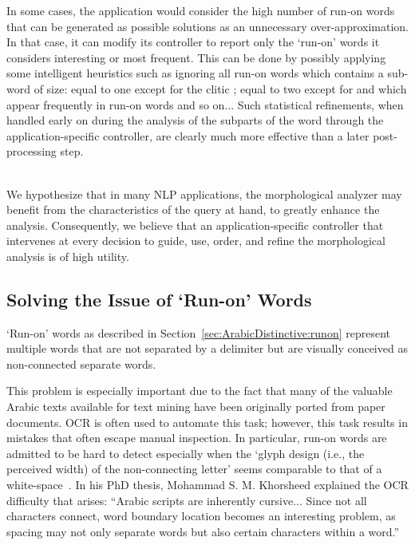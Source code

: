 \documentclass[a4,12pt]{report}
\newcommand{\noVocRL}[1]{\transtrue\novocalize\RL{#1}\vocalize}
\begin{document}
In some cases, the application would consider the high number of run-on words that can be generated as possible solutions
as an unnecessary over-approximation. In that case, it can modify its controller to report only the `run-on' words it considers
interesting or most frequent. This can be done by possibly applying some intelligent heuristics such as ignoring all run-on words
which contains a sub-word of size: equal to one except for the clitic \noVocRL{w}; equal to two except for \noVocRL{mA} 
and \noVocRL{lA} which appear frequently in run-on words and so on... Such statistical refinements, when handled early on during
the analysis of the subparts of the word through the application-specific controller, are clearly much more effective than 
a later post-processing step.

~\\

We hypothesize that in many NLP applications, the morphological analyzer may
benefit from the characteristics of the query at hand, 
to greatly enhance the analysis.
Consequently, we believe that 
an application-specific 
controller that intervenes at every decision to guide, use, order, and 
refine the morphological analysis is of high utility.

\subsection{Solving the Issue of `Run-on' Words}

`Run-on' words as described in Section~\ref{sec:ArabicDistinctive:runon} represent multiple words
that are not separated by a delimiter but are visually conceived as non-connected separate words.

This problem is especially important due to the fact that many of the valuable 
Arabic texts available for text mining have been originally ported from
paper documents. OCR is often used to automate this task; however, this task
results in mistakes that often escape manual inspection.
In particular, run-on words are admitted 
to be hard to detect especially when the `glyph design (i.e., the
perceived width) of the non-connecting letter' seems comparable
to that of a white-space~\cite{Sou07}. In his PhD thesis, Mohammad S. M. Khorsheed
explained the OCR difficulty that arises: ``Arabic scripts are inherently cursive...
Since not all characters connect, word boundary location becomes an interesting problem, 
as spacing may not only separate words but also certain characters within a word.''~\cite{Khorsheed:00}
\end{document}
